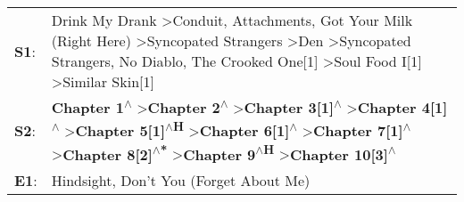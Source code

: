 \begin{supertabular}{p{0.03\textwidth}p{0.92\textwidth}}
 \textbf{S1}:  &                                                                                                                                         Drink My Drank\textsuperscript{} \textgreater \enspace Conduit\textsuperscript{}, \enspace Attachments\textsuperscript{}, \enspace Got Your Milk (Right Here)\textsuperscript{} \textgreater \enspace Syncopated Strangers\textsuperscript{} \textgreater \enspace Den\textsuperscript{} \textgreater \enspace Syncopated Strangers\textsuperscript{}, \enspace No Diablo\textsuperscript{}, \enspace The Crooked One[1]\textsuperscript{} \textgreater \enspace Soul Food I[1]\textsuperscript{} \textgreater \enspace Similar Skin[1]\textsuperscript{}  \enspace  \\
 \textbf{S2}:  &  \textbf{Chapter 1\textsuperscript{$\wedge$}} \textgreater \enspace \textbf{Chapter 2\textsuperscript{$\wedge$}} \textgreater \enspace \textbf{Chapter 3[1]\textsuperscript{$\wedge$}} \textgreater \enspace \textbf{Chapter 4[1]\textsuperscript{$\wedge$}} \textgreater \enspace \textbf{Chapter 5[1]\textsuperscript{$\wedge$H}} \textgreater \enspace \textbf{Chapter 6[1]\textsuperscript{$\wedge$}} \textgreater \enspace \textbf{Chapter 7[1]\textsuperscript{$\wedge$}} \textgreater \enspace \textbf{Chapter 8[2]\textsuperscript{$\wedge$*}} \textgreater \enspace \textbf{Chapter 9\textsuperscript{$\wedge$H}} \textgreater \enspace \textbf{Chapter 10[3]\textsuperscript{$\wedge$}}  \enspace  \\
 \textbf{E1}:  &                                                                                                                                                                                                                                                                                                                                                                                                                                                                                                                                                                                                               Hindsight\textsuperscript{}, \enspace Don't You (Forget About Me)\textsuperscript{}  \enspace  \\
\end{supertabular}
